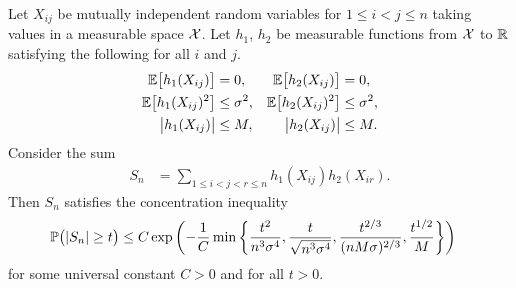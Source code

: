 \begin{lemma}
  \label{lem:dyadic_concentration}

  Let $X_{i j}$ be mutually independent random variables
  for $1 \leq i < j \leq n$
  taking values in a measurable space $\cX$.
  Let $h_1$, $h_2$
  be measurable functions from $\cX$ to $\R$
  satisfying the following
  for all $i$ and $j$.
  \begin{align*}
    \E\big[h_1(X_{i j})\big]
    &= 0,
    &\E\big[h_2(X_{i j})\big]
    &=0, \\
    \E\big[h_1(X_{i j})^2\big]
    &\leq \sigma^2,
    &\E\big[h_2(X_{i j})^2\big]
    &\leq \sigma^2, \\
    \big|h_1(X_{i j})\big|
    &\leq M,
    &\big|h_2(X_{i j})\big|
    &\leq M.
  \end{align*}
  Consider the sum
  \begin{align*}
    S_n
    &=
    \sum_{1 \leq i < j < r \leq n}
    h_1(X_{i j})
    h_2(X_{i r}).
  \end{align*}
  Then $S_n$ satisfies the concentration inequality
  \begin{align*}
    \P\big(
      |S_n| \geq t
    \big)
    &\leq
    C \exp\left(
      -\frac{1}{C}
      \min \left\{
        \frac{t^2}{n^3 \sigma^4},
        \frac{t}{\sqrt{n^3 \sigma^4}},
        \frac{t^{2/3}}{(n M \sigma)^{2/3}},
        \frac{t^{1/2}}{M}
      \right\}
    \right)
  \end{align*}
  for some universal constant
  $C > 0$
  and for all $t>0$.

\end{lemma}

